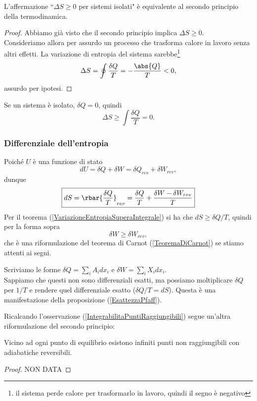 \begin{proposition}
L'affermazione ``$\Delta S\geq 0$ per sistemi isolati" \`e equivalente al secondo principio della termodinamica.
\end{proposition}
\begin{proof}
Abbiamo gi\`a visto che il secondo principio implica $\Delta S\geq 0$.\\
Consideriamo allora per assurdo un processo che trasforma calore in lavoro senza altri effetti. 
La variazione di entropia del sistema sarebbe\footnote{il sistema perde calore per trasformarlo in lavoro, quindi il segno \`e negativo} 
\[\Delta S=\oint \frac{\delta Q}T=-\frac{\abs{Q}}T<0,\]
assurdo per ipotesi.
\end{proof}

\begin{remark}
Se un sistema \`e isolato, $\delta Q=0$, quindi \[\Delta S\geq \int \frac{\delta Q}T=0.\]
\end{remark}

\subsubsection{Differenziale dell'entropia}
\begin{remark}
Poich\'e $U$ \`e una funzione di stato
\[dU=\delta Q+\delta W=\delta Q_{rev}+\delta W_{rev},\]
dunque
\[\boxed{dS=\rbar{\frac{\delta Q}T}_{rev}=\frac{\delta Q}T+\frac{\delta W-\delta W_{rev}}T}\]
Per il teorema (\ref{VariazioneEntropiaSuperaIntegrale}) si ha che $dS\geq \delta Q/T$, quindi per la forma sopra
\[\delta W\geq \delta W_{rev},\]
che \`e una riformulazione del teorema di Carnot (\ref{TeoremaDiCarnot}) se stiamo attenti ai segni.
\end{remark}

\begin{remark}
Scriviamo le forme $\delta Q=\sum_i A_idx_i$ e $\delta W=\sum_i X_idx_i$.\\
Sappiamo che questi non sono differenziali esatti, ma possiamo moltiplicare $\delta Q$ per $1/T$ e rendere quel differenziale esatto ($\delta Q/T=dS$). Questa \`e una manifestazione della proposizione (\ref{EsattezzaPfaff}).
\end{remark} 

\noindent
Ricalcando l'osservazione (\ref{IntegrabilitaPuntiRaggiungibili}) segue un'altra riformulazione del secondo principio:
\begin{proposition}\label{SecondoPrincipioCaratheodory}
Vicino ad ogni punto di equilibrio esistono infiniti punti non raggiungibili con adiabatiche reversibili.
\end{proposition}
\begin{proof}
NON DATA
\end{proof}

